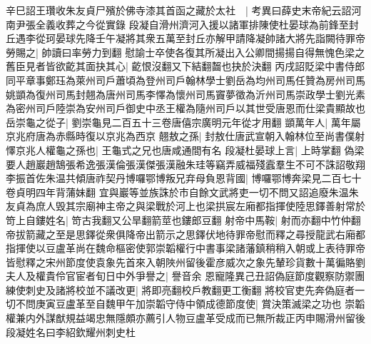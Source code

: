 辛巳詔王瓚收朱友貞尸殯於佛寺漆其首函之藏於太社　|{
	考異曰薛史末帝紀云詔河南尹張全義收葬之今從實錄}
段凝自滑州濟河入援以諸軍排陳使杜晏球為前鋒至封丘遇李從珂晏球先降壬午凝將其衆五萬至封丘亦解甲請降凝帥諸大將先詣闕待罪帝勞賜之|{
	帥讀曰率勞力到翻}
慰諭士卒使各復其所凝出入公卿間揚揚自得無愧色梁之舊臣見者皆欲齕其面抉其心|{
	齕恨沒翻又下結翻齧也抉於決翻}
丙戌詔貶梁中書侍郎同平章事鄭珏為萊州司戶蕭頃為登州司戶翰林學士劉岳為均州司馬任贊為房州司馬姚顗為復州司馬封翹為唐州司馬李懌為懷州司馬竇夢徵為沂州司馬崇政學士劉光素為密州司戶陸崇為安州司戶御史中丞王權為隨州司戶以其世受唐恩而仕梁貴顯故也岳崇龜之從子|{
	劉崇龜見二百五十三卷唐僖宗廣明元年從才用翻}
顗萬年人|{
	萬年屬京兆府唐為赤縣時復以京兆為西京}
翹敖之孫|{
	封敖仕唐武宣朝入翰林位至尚書僕射}
懌京兆人權龜之孫也|{
	王龜式之兄也唐咸通間有名}
段凝杜晏球上言|{
	上時掌翻}
偽梁要人趙巖趙鵠張希逸張漢倫張漢傑張漢融朱珪等竊弄威福殘蠧羣生不可不誅詔敬翔李振首佐朱温共傾唐祚契丹博囉鄂博叛兄弃母負恩背國|{
	博囉鄂博奔梁見二百七十卷貞明四年背蒲妹翻}
宜與巖等並族誅於市自餘文武將吏一切不問又詔追廢朱温朱友貞為庶人毁其宗廟神主帝之與梁戰於河上也梁拱宸左廂都指揮使陸思鐸善射常於笴上自鏤姓名|{
	笴古我翻又公旱翻箭莖也鏤郎豆翻}
射帝中馬鞍|{
	射而亦翻中竹仲翻}
帝拔箭藏之至是思鐸從衆俱降帝出箭示之思鐸伏地待罪帝慰而釋之尋授龍武右廂都指揮使以豆盧革尚在魏命樞密使郭崇韜權行中書事梁諸藩鎮稍稍入朝或上表待罪帝皆慰釋之宋州節度使袁象先首來入朝陜州留後霍彦威次之象先輦珍貨數十萬徧賂劉夫人及權貴伶官宦者旬日中外爭譽之|{
	譽音余}
恩寵隆異己丑詔偽庭節度觀察防禦團練使刺史及諸將校並不議改更|{
	將即亮翻校戶教翻更工衡翻}
將校官吏先奔偽庭者一切不問庚寅豆盧革至自魏甲午加崇韜守侍中領成德節度使|{
	賞決策滅梁之功也}
崇韜權兼内外謀猷規益竭忠無隱頗亦薦引人物豆盧革受成而已無所裁正丙申賜滑州留後段凝姓名曰李紹欽耀州刺史杜


